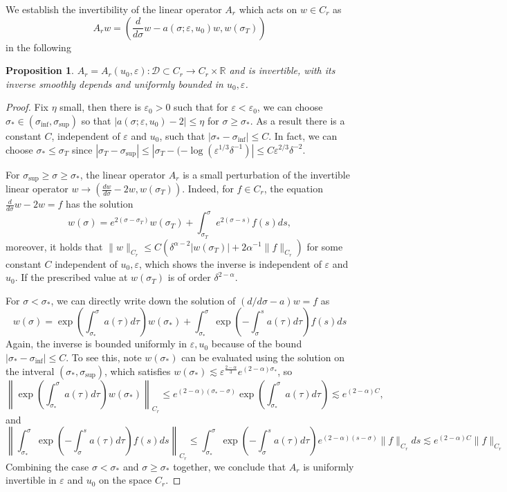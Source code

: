 \documentclass[letterpaper,11pt]{article}
\newcommand{\eps}{\varepsilon}
\newcommand{\lar}{ \lesssim }
\numberwithin{equation}{section}
\theoremstyle{plain}
\newtheorem{proposition}[theorem]{Proposition}
\begin{document}
We establish the invertibility of the linear operator $A_r$ which acts on $w \in C_{r}$ as 
\[
A_r w = \left( \frac{d}{d\sigma}w-a(\sigma;\eps, u_0) w,  w(\sigma_T)\right)
\]
in the following
\begin{proposition}\label{inv_A_r}
$A_r=A_r(u_0,\eps) : \mathcal{D}\subset C_{r} \to C_{r}\times \mathbb{R}$ and is invertible, with its inverse smoothly depends and uniformly bounded in $u_0, \eps$. 
\end{proposition}
\begin{proof}
Fix $\eta$ small, then there is $\eps_0>0$ such that for $\eps<\eps_0$, we can choose $\sigma_* \in (\sigma_{\inf}, \sigma_{\sup})$ so that $|a(\sigma; \eps, u_0)-2| \le \eta$ for $\sigma \ge \sigma_*$. As a result there is a constant $C$, independent of $\eps$ and $u_0$, such that $|\sigma_*-\sigma_{\inf}|\le C$. In fact, we can choose $\sigma_* \le \sigma_T$ since $|\sigma_T-\sigma_{\sup}| \le |\sigma_T - (-\log(\eps^{1/3}\delta^{-1})|\le C\eps^{2/3}\delta^{-2}$.

For $\sigma_{\sup} \ge \sigma \ge \sigma_*$, the linear operator $A_r$ is a small perturbation of the invertible linear operator $w \to \left(\frac{dw}{d\sigma}-2w, w(\sigma_T) \right)$. Indeed, for $f \in C_{r}$, the equation $\frac{d}{d\sigma}w-2w = f$
has the solution
\[
w(\sigma) = e^{2(\sigma-\sigma_T)}w(\sigma_T)+\int_{\sigma_T}^\sigma e^{2(\sigma-s)}f(s)ds,
\]
moreover, it holds that $\|w\|_{C_{r}} \le C(\delta^{\alpha-2}|w(\sigma_T)| + 2\alpha^{-1}\|f\|_{C_{r}})$ for some constant $C$ independent of $u_0,\eps$, which shows the inverse is independent of $\eps$ and $u_0$. If the prescribed value at $w(\sigma_T)$ is of order $\delta^{2-\alpha}$.

For $\sigma < \sigma_*$, we can directly write down the solution of $(d/d\sigma - a)w = f$ as
\[
w(\sigma) = \exp\left(\int^{\sigma}_{\sigma_*} a(\tau)d\tau\right) w(\sigma_*) + \int_{\sigma_*}^{\sigma} \exp\left(-\int_{\sigma}^{s}a(\tau)d\tau\right)f(s)ds 
\]
 Again, the inverse is bounded uniformly in $\eps, u_0$ because of the bound $|\sigma_*-\sigma_{\inf}|\le C$. To see this, note $w(\sigma_*)$ can be evaluated using the solution on the intveral $(\sigma_*,\sigma_{\sup})$, which satisfies $w(\sigma_*) \lar \eps^{\frac{2-\alpha}{3}}e^{(2-\alpha)\sigma_*}$, so 
\[
\left\|\exp\left(\int^{\sigma}_{\sigma_*} a(\tau)d\tau\right) w(\sigma_*)\right\|_{C_{r}} \le e^{(2-\alpha)(\sigma_*-\sigma)}\exp\left(\int^{\sigma}_{\sigma_*} a(\tau)d\tau\right) \lar e^{(2-\alpha)C},
\]
and
\[
\left\| \int_{\sigma_*}^{\sigma} \exp\left(-\int_{\sigma}^{s}a(\tau)d\tau\right)f(s)ds\right\|_{C_{r}} \le \int_{\sigma_*}^{\sigma} \exp\left(-\int_{\sigma}^{s}a(\tau)d\tau\right)e^{(2-\alpha)(s-\sigma)} \|f\|_{C_{r}}ds \lar e^{(2-\alpha)C}\|f\|_{C_{r}}
\]
Combining the case $\sigma< \sigma_*$ and $\sigma \ge \sigma_*$ together, we conclude that $A_r$ is uniformly invertible in $\eps$ and $u_0$ on the space $C_{r}$.
\end{proof}
\end{document}
